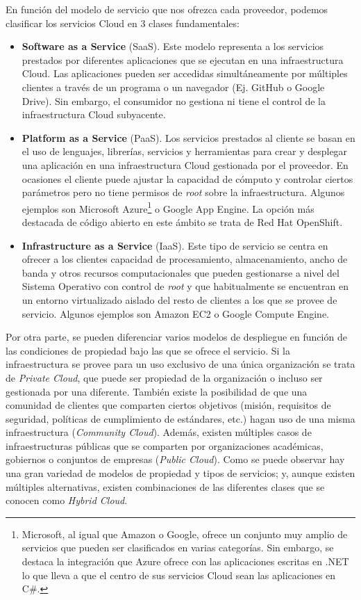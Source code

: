 En función del modelo de servicio que nos ofrezca cada proveedor, podemos clasificar los servicios Cloud en 3 clases fundamentales:

\begin{itemize}
\item \textbf{Software as a Service} (SaaS). Este modelo representa a los servicios prestados por diferentes aplicaciones que se ejecutan en una infraestructura Cloud. Las aplicaciones pueden ser accedidas simultáneamente por múltiples clientes a través de un programa o un navegador (Ej. GitHub o Google Drive). Sin embargo, el consumidor no gestiona ni tiene el control de la infraestructura Cloud subyacente.
\item \textbf{Platform as a Service} (PaaS). Los servicios prestados al cliente se basan en el uso de lenguajes, librerías, servicios y herramientas para crear y desplegar una aplicación en una infraestructura Cloud gestionada por el proveedor. En ocasiones el cliente puede ajustar la capacidad de cómputo y controlar ciertos parámetros pero no tiene permisos de \textit{root} sobre la infraestructura. Algunos ejemplos son Microsoft Azure\footnote{Microsoft, al igual que Amazon o Google, ofrece un conjunto muy amplio de servicios que pueden ser clasificados en varias categorías. Sin embargo, se destaca la integración que Azure ofrece con las aplicaciones escritas en .NET lo que lleva a que el centro de sus servicios Cloud sean las aplicaciones en C\#.} o Google App Engine. La opción más destacada de código abierto en este ámbito se trata de Red Hat OpenShift.
\item \textbf{Infrastructure as a Service} (IaaS). Este tipo de servicio se centra en ofrecer a los clientes capacidad de procesamiento, almacenamiento, ancho de banda y otros recursos computacionales que pueden gestionarse a nivel del Sistema Operativo con control de \emph{root} y que habitualmente se encuentran en un entorno virtualizado aislado del resto de clientes a los que se provee de servicio. Algunos ejemplos son Amazon EC2 o Google Compute Engine.
\end{itemize}

Por otra parte, se pueden diferenciar varios modelos de despliegue en función de las condiciones de propiedad bajo las que se ofrece el servicio. Si la infraestructura se provee para un uso exclusivo de una única organización se trata de \emph{Private Cloud}, que puede ser propiedad de la organización o incluso ser gestionada por una diferente. También existe la posibilidad de que una comunidad de clientes que comparten ciertos objetivos (misión, requisitos de seguridad, políticas de cumplimiento de estándares, etc.) hagan uso de una misma infraestructura (\emph{Community Cloud}). Además, existen múltiples casos de infraestructuras públicas que se comparten por organizaciones académicas, gobiernos o conjuntos de empresas (\emph{Public Cloud}). Como se puede observar hay una gran variedad de modelos de propiedad y tipos de servicios; y, aunque existen múltiples alternativas, existen combinaciones de las diferentes clases que se conocen como \emph{Hybrid Cloud}.

